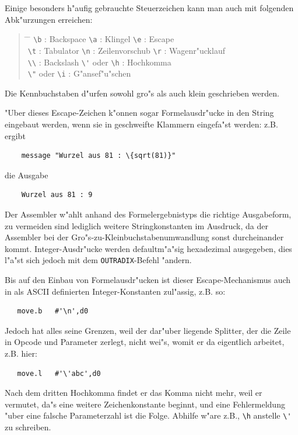 \documentclass[12pt,a4paper,twoside]{report}
\newcommand{\tty}[1]{{\tt #1}}
\begin{document}
Einige besonders h"aufig gebrauchte Steuerzeichen kann man auch mit
folgenden Abk"urzungen erreichen:
\begin{quote}\begin{tabbing}
\hspace{4cm} \= \hspace{4cm} \= \kill
\verb!\b! : Backspace \> \verb!\a! : Klingel        \> \verb!\e! : Escape \\
\verb!\t! : Tabulator \> \verb!\n! : Zeilenvorschub \> \verb!\r! : Wagenr"ucklauf \\
\verb!\\! : Backslash \> \verb!\'! oder \verb!\h! : Hochkomma \\
\verb!\"! oder \verb!\i! : G"ansef"u"schen \\
\end{tabbing}\end{quote}
Die Kennbuchstaben d"urfen sowohl gro"s als auch klein geschrieben
werden.
\par
"Uber dieses Escape-Zeichen k"onnen sogar Formelausdr"ucke in den
String eingebaut werden, wenn sie in geschweifte Klammern eingefa"st
werden: z.B. ergibt
\begin{verbatim}
    message "Wurzel aus 81 : \{sqrt(81)}"
\end{verbatim}
die Ausgabe
\begin{verbatim}
    Wurzel aus 81 : 9
\end{verbatim}
Der Assembler w"ahlt anhand des Formelergebnistyps die richtige
Ausgabeform, zu vermeiden sind lediglich weitere Stringkonstanten
im Ausdruck, da der Assembler bei der Gro"s-zu-Kleinbuchstabenumwandlung
sonst durcheinander kommt.  Integer-Ausdr"ucke werden defaultm"a"sig
hexadezimal ausgegeben, dies l"a"st sich jedoch mit dem
\tty{OUTRADIX}-Befehl "andern.
\par
Bis auf den Einbau von Formelausdr"ucken ist dieser Escape-Mechanismus
auch in als ASCII definierten Integer-Konstanten zul"assig, z.B. so:
\begin{verbatim}
   move.b   #'\n',d0
\end{verbatim}
Jedoch hat alles seine Grenzen, weil der dar"uber liegende Splitter, der
die Zeile in Opcode und Parameter zerlegt, nicht wei"s, womit er da
eigentlich arbeitet, z.B. hier:
\begin{verbatim}
   move.l   #'\'abc',d0
\end{verbatim}
Nach dem dritten Hochkomma findet er das Komma nicht mehr, weil er
vermutet, da"s eine weitere Zeichenkonstante beginnt, und eine
Fehlermeldung "uber eine falsche Parameterzahl ist die Folge.  Abhilfe
w"are z.B., \verb!\h! anstelle \verb!\'! zu schreiben.
\end{document}
